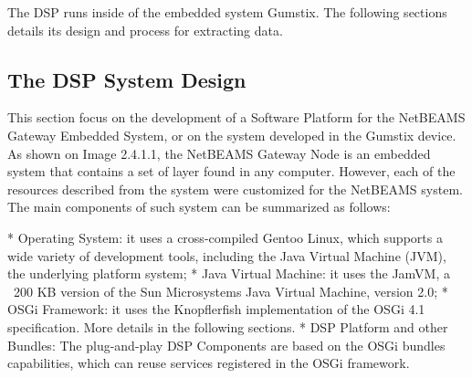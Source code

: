 The DSP runs inside of the embedded system Gumstix. The following sections
details its design and process for extracting data.

\subsection{The DSP System Design}

This section focus on the development of a Software Platform for the NetBEAMS Gateway Embedded System, or on the system developed in the Gumstix device. As shown on Image 2.4.1.1, the NetBEAMS Gateway Node is an embedded system that contains a set of layer found in any computer. However, each of the resources described from the system were customized for the NetBEAMS system. The main components of such system can be summarized as follows: 

    * Operating System: it uses a cross-compiled Gentoo Linux, which supports a wide variety of development tools, including the Java Virtual Machine (JVM), the underlying platform system;
    * Java Virtual Machine: it uses the JamVM, a ~200 KB version of the Sun Microsystems Java Virtual Machine, version 2.0;
    * OSGi Framework: it uses the Knopflerfish implementation of the OSGi 4.1 specification. More details in the following sections.
    * DSP Platform and other Bundles: The plug-and-play DSP Components are based on the OSGi bundles capabilities, which can reuse services registered in the OSGi framework.
